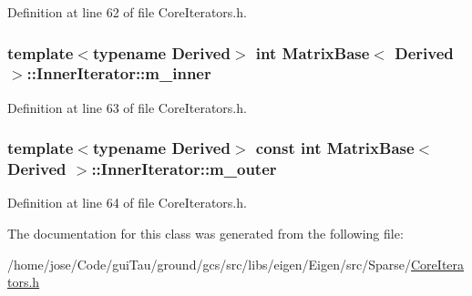 Definition at line 62 of file Core\-Iterators.\-h.

\hypertarget{class_matrix_base_1_1_inner_iterator_a8457d5cf1881f3000067fcff294fd814}{
\subsubsection[{m\-\_\-inner}]{\setlength{\rightskip}{0pt plus 5cm}template$<$typename Derived$>$ {\bf int} {\bf Matrix\-Base}$<$ Derived $>$\-::Inner\-Iterator\-::m\-\_\-inner\hspace{0.3cm}{\ttfamily [protected]}}}\label{class_matrix_base_1_1_inner_iterator_a8457d5cf1881f3000067fcff294fd814}


Definition at line 63 of file Core\-Iterators.\-h.

\hypertarget{class_matrix_base_1_1_inner_iterator_a1b250aa4b15602eb22d7d99e36690f1b}{
\subsubsection[{m\-\_\-outer}]{\setlength{\rightskip}{0pt plus 5cm}template$<$typename Derived$>$ const {\bf int} {\bf Matrix\-Base}$<$ Derived $>$\-::Inner\-Iterator\-::m\-\_\-outer\hspace{0.3cm}{\ttfamily [protected]}}}\label{class_matrix_base_1_1_inner_iterator_a1b250aa4b15602eb22d7d99e36690f1b}


Definition at line 64 of file Core\-Iterators.\-h.



The documentation for this class was generated from the following file\-:\begin{DoxyCompactItemize}
\item 
/home/jose/\-Code/gui\-Tau/ground/gcs/src/libs/eigen/\-Eigen/src/\-Sparse/\hyperlink{_core_iterators_8h}{Core\-Iterators.\-h}\end{DoxyCompactItemize}
